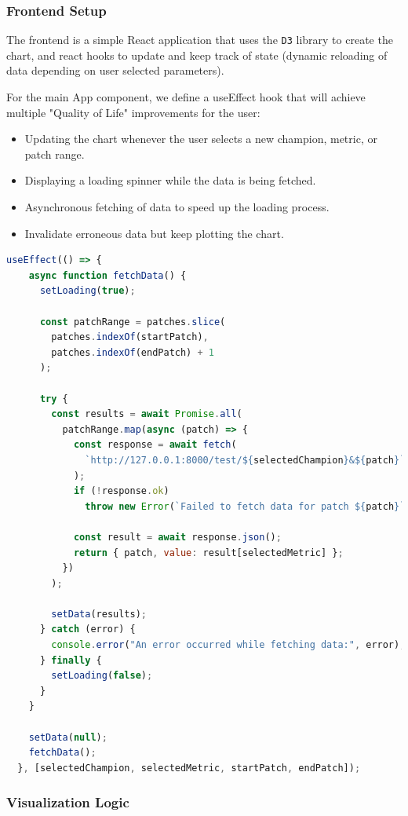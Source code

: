 \documentclass{article}
\begin{document}
\subsubsection{Frontend Setup}
\label{subsubsec:Frontend}

The frontend is a simple React application that uses the 
\texttt{D3} library to create the chart, and react hooks to update 
and keep track of state (dynamic reloading of data depending on user
selected parameters).

For the main App component, we define a useEffect hook that will achieve
multiple "Quality of Life" improvements for the user:
\begin{itemize}
  \item Updating the chart whenever the user selects a new champion, metric, or patch range.
  \item Displaying a loading spinner while the data is being fetched.
  \item Asynchronous fetching of data to speed up the loading process.
  \item Invalidate erroneous data but keep plotting the chart.
\end{itemize}

\begin{lstlisting}[language=Javascript]
useEffect(() => {
    async function fetchData() {
      setLoading(true);

      const patchRange = patches.slice(
        patches.indexOf(startPatch),
        patches.indexOf(endPatch) + 1
      );

      try {
        const results = await Promise.all(
          patchRange.map(async (patch) => {
            const response = await fetch(
              `http://127.0.0.1:8000/test/${selectedChampion}&${patch}`
            );
            if (!response.ok)
              throw new Error(`Failed to fetch data for patch ${patch}`);

            const result = await response.json();
            return { patch, value: result[selectedMetric] };
          })
        );

        setData(results);
      } catch (error) {
        console.error("An error occurred while fetching data:", error);
      } finally {
        setLoading(false);
      }
    }

    setData(null);
    fetchData();
  }, [selectedChampion, selectedMetric, startPatch, endPatch]);
\end{lstlisting}

\subsubsection{Visualization Logic}
\label{subsubsec:Visualization Logic}



\begin{refcontext}[sorting=nyt]
\printbibliography
\end{refcontext}
\end{document}
